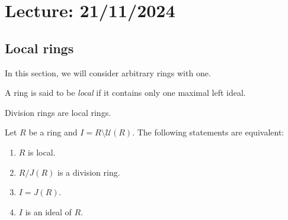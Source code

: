 \section{Lecture: 21/11/2024}
\label{09}

\subsection{Local rings}

In this section, we will consider arbitrary rings with one. 

\begin{definition}
    A ring is said to be \emph{local} if it contains only one maximal left ideal. 
\end{definition}

Division rings are local rings. 


\begin{theorem}
\label{thm:local}
    Let $R$ be a ring and $I=R\setminus\mathcal{U}(R)$. The following
    statements are equivalent:
    \begin{enumerate}
        \item $R$ is local.
        \item $R/J(R)$ is a division ring.
        \item $I=J(R)$.
        \item $I$ is an ideal of $R$.
    \end{enumerate}
\end{theorem}

